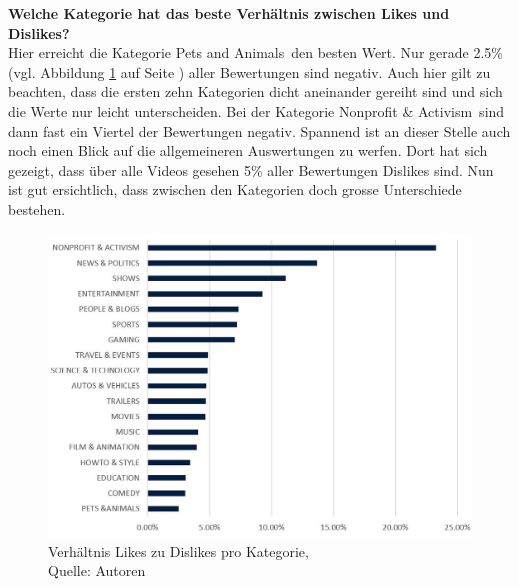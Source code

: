 \documentclass[12pt,titlepage]{article}
\begin{document}
\textbf{Welche Kategorie hat das beste Verhältnis zwischen Likes und Dislikes?}\\
Hier erreicht die Kategorie \glqq Pets and Animals\grqq\, den besten Wert. Nur gerade 2.5\% (vgl. Abbildung \ref{img:Verhältnis Likes zu Dislikes pro Kategorie} auf Seite \pageref{img:Verhältnis Likes zu Dislikes pro Kategorie}) aller Bewertungen sind negativ. Auch hier gilt zu beachten, dass die ersten zehn Kategorien dicht aneinander gereiht sind und sich die Werte nur leicht unterscheiden. Bei der Kategorie \glqq Nonprofit \& Activism\grqq\, sind dann fast ein Viertel der Bewertungen negativ. Spannend ist an dieser Stelle auch noch einen Blick auf die allgemeineren Auswertungen zu werfen. Dort hat sich gezeigt, dass über alle Videos gesehen 5\% aller Bewertungen Dislikes sind. Nun ist gut ersichtlich, dass zwischen den Kategorien doch grosse Unterschiede bestehen.\\
\begin{figure}[h]
	\centering
	\includegraphics[width=14cm]{IMG/grafik_LikesDislikesKat.JPG}
	\caption[Verhältnis Likes zu Dislikes pro Kategorie]{Verhältnis Likes zu Dislikes pro Kategorie,\\ Quelle: Autoren}
	\label{img:Verhältnis Likes zu Dislikes pro Kategorie}
\end{figure}
\end{document}
